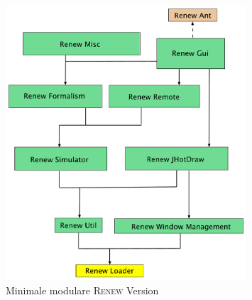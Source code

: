 	\begin{figure}[h!]
	  \centering
	  \includegraphics[width=0.8\textwidth]{material/images/renew_plugin_dependencies-migrate_opt.pdf}
	  \caption{Minimale modulare \textsc{Renew} Version}
	  \label{fig:fin_res}
	\end{figure}
